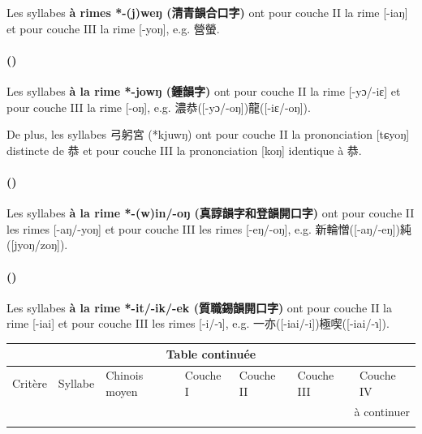 \documentclass{scrbook}
\newcounter{c}[subsubsection]
\newcommand{\stpc}[1]{\stepcounter{#1}}
\newcommand{\termyyx}[1]{\textbf{#1}}
\begin{document}
\begin{sloppypar}
Les syllabes \termyyx{à rimes *-(j)weŋ (清青韻合口字)} ont pour couche II la rime [-iaŋ] et pour couche III la rime [-yoŋ], e.g. 營螢.

\stpc{c}\paragraph{()}
Les syllabes \termyyx{à la rime *-jowŋ (鍾韻字)} ont pour couche II la rime [-yɔ/-iɛ] et pour couche III la rime [-oŋ], e.g. 濃恭([-yɔ/-oŋ])龍([-iɛ/-oŋ]). 

De plus, les syllabes 弓躬宮 (*kjuwŋ) ont pour couche II la prononciation [tɕyoŋ] distincte de 恭 et pour couche III la prononciation [koŋ] identique à 恭.

\stpc{c}\paragraph{()}
Les syllabes \termyyx{à la rime *-(w)in/-oŋ (真諄韻字和登韻開口字)} ont pour couche II les rimes [-aŋ/-yoŋ] et pour couche III les rimes [-eŋ/-oŋ], e.g. 新輪憎([-aŋ/-eŋ])純([jyoŋ/zoŋ]).

\stpc{c}\paragraph{()}
Les syllabes \termyyx{à la rime *-it/-ik/-ek (質職錫韻開口字)} ont pour couche II la rime [-iai] et pour couche III les rimes [-i/-ɿ], e.g. 一亦([-iai/-i])極喫([-iai/-ɿ]).

\begin{landscape}
\begin{longtable}[htbp]{lllllll}
    \endfirsthead

    \multicolumn{7}{c}{Table continuée} \\
    \toprule
	Critère & Syllabe & Chinois moyen  & \multicolumn{1}{l}{Couche I} & Couche II & Couche III & \multicolumn{1}{l}{Couche IV} \\
    \hline
    \endhead

    \hline
    \multicolumn{7}{r}{à continuer} \\
    \endfoot
    \endlastfoot
    

\end{longtable}
\end{landscape}
\end{sloppypar}
\end{document}
